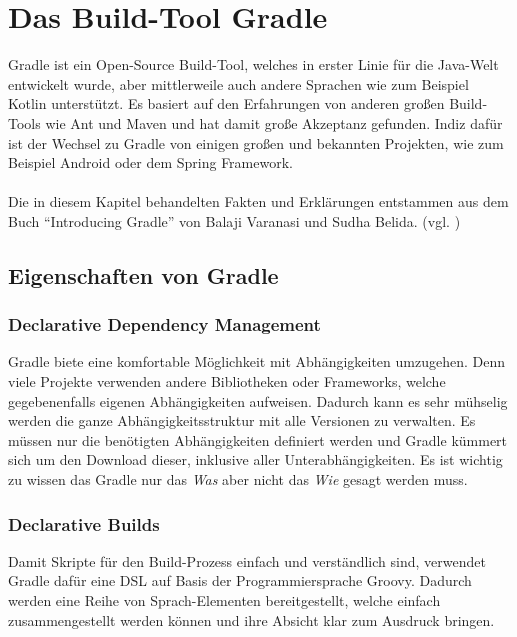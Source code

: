 
\section{Das Build-Tool Gradle}
Gradle ist ein Open-Source Build-Tool, welches in erster Linie für die Java-Welt entwickelt wurde, aber mittlerweile auch andere Sprachen wie zum Beispiel Kotlin unterstützt. Es basiert auf den Erfahrungen von anderen großen Build-Tools wie Ant und Maven und hat damit große Akzeptanz gefunden. Indiz dafür ist der Wechsel zu Gradle von einigen großen und bekannten Projekten, wie zum Beispiel Android oder dem Spring Framework.\\
\\
Die in diesem Kapitel behandelten Fakten und Erklärungen entstammen aus dem Buch \enquote{Introducing Gradle} von Balaji Varanasi und Sudha Belida. (vgl. \cite{introducingGradle})

\subsection{Eigenschaften von Gradle}
\subsubsection{Declarative Dependency Management}
Gradle biete eine komfortable Möglichkeit mit Abhängigkeiten umzugehen. Denn viele Projekte verwenden andere Bibliotheken oder Frameworks, welche gegebenenfalls eigenen Abhängigkeiten aufweisen. Dadurch kann es sehr mühselig werden die ganze Abhängigkeitsstruktur mit alle Versionen zu verwalten. Es müssen nur die benötigten Abhängigkeiten definiert werden und Gradle kümmert sich um den Download dieser, inklusive aller Unterabhängigkeiten. Es ist wichtig zu wissen das Gradle nur das \textit{Was} aber nicht das \textit{Wie} gesagt werden muss.

\subsubsection{Declarative Builds}
Damit Skripte für den Build-Prozess einfach und verständlich sind, verwendet Gradle dafür eine \gls{DSL} auf Basis der Programmiersprache Groovy. Dadurch werden eine Reihe von Sprach-Elementen bereitgestellt, welche einfach zusammengestellt werden können und ihre Absicht klar zum Ausdruck bringen.

